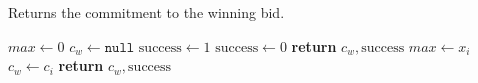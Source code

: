 \begin{algorithm}
    \caption{Returns the commitment to the winning bid.}
    \label{verifiable_auction}
    \begin{algorithmic}[1]
        \State $max \gets 0$
        \State $c_w \gets \mathtt{null}$
        \State $\text{success} \gets 1$
                \State $\text{success} \gets 0$
                \State \textbf{return} $c_w, \text{success}$
            \EndIf
                \State $max \gets x_i$
                \State $c_w \gets c_i$
            \EndIf
        \EndFor
        \State \textbf{return} $c_w, \text{success}$
        \EndFunction
    \end{algorithmic}
\end{algorithm}